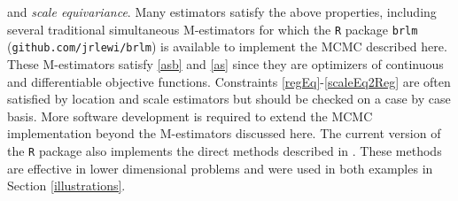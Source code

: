\documentclass[ba]{imsart}
\makeatletter
\def\bbeta{\mbox{\boldmath $\beta$}}
\newcommand{\by}{\mbox{\boldmath $y$}}
\newcommand{\bv}{\mbox{\boldmath $v$}}
\newcommand{\bb}{\mbox{\boldmath $b$}}
\newcommand{\response}[1]{{\color{blue}#1}}
\newcommand{\labitem}[2]{%
\def\@itemlabel{\textbf{#1}{.}}
\item
\def\@currentlabel{#1}\label{#2}}
\makeatother
\begin{document}
and \textit{scale equivariance}. 
Many estimators satisfy the above properties, including several traditional simultaneous M-estimators \citep{huber2009, maronna2006} for which the \texttt{R} package \texttt{brlm} (\texttt{github.com/jrlewi/brlm}) is available to implement the MCMC described here. 
These M-estimators satisfy \ref{asb} and \ref{as} since they are optimizers of continuous and differentiable objective functions. Constraints \ref{regEq}-\ref{scaleEq2Reg} are often satisfied by location and scale estimators but should be checked on a case by case basis. 
More software development is required to extend the MCMC implementation beyond the M-estimators discussed here. The current version of the \texttt{R} package also implements the direct methods described in \cite{lewis2014}. These methods are effective in lower dimensional problems and were used in both examples in Section \ref{illustrations}.

\end{document}
